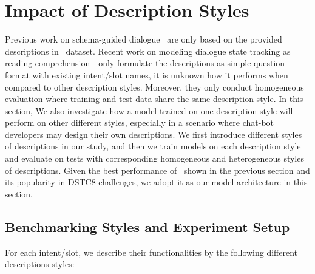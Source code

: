 \section{Impact of Description Styles}
\label{sec:sgd:abl-desc}
Previous work on schema-guided dialogue~\citep{rastogi2020schema} are
only based on the provided descriptions in \sgdst~dataset. Recent work
on modeling dialogue state tracking as reading
comprehension~\citep{gao2019dialog}~only formulate the descriptions as
simple question format with existing intent/slot names, it is unknown
how it performs when compared to other description styles. Moreover,
they only conduct homogeneous evaluation where training and test data
share the same description style. In this section, We also investigate
how a model trained on one description style will perform on other
different styles, especially in a scenario where chat-bot developers
may design their own descriptions. We first introduce different styles
of descriptions in our study, and then we train models on each
description style and evaluate on tests with corresponding homogeneous
and heterogeneous styles of descriptions. Given the best performance
of \CE~shown in the previous section and its popularity in DSTC8
challenges, we adopt it as our model architecture in this section.

\subsection{Benchmarking Styles and Experiment Setup}
\label{ssec:desc-styles}
For each intent/slot, we describe their functionalities by the
following different descriptions styles:

